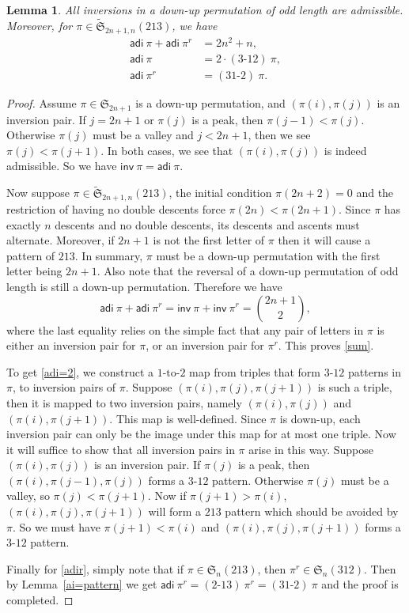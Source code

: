 \documentclass[12pt,reqno]{amsart}
\numberwithin{equation}{section}
\theoremstyle{plain}
\newtheorem{lemma}[theorem]{Lemma}
\theoremstyle{definition}
\def\S{\mathfrak{S}}
\def\ai{\mathsf{adi}}
\def\inv{\mathsf{inv}}
\def\cab{31\text{-}2}
\def\bac{2\text{-}13}
\begin{document}
\begin{lemma}\label{213ai}
All inversions in a down-up permutation of odd length are admissible. Moreover, for $\pi\in \widetilde{\S}_{2n+1, n}(213)$, we have
\begin{align}
\label{sum}
\ai\:\pi+\ai\:\pi^r &= 2n^2+n,\\
\label{adi=2}
\ai\:\pi &=2\cdot(3\text{-}12)\:\pi, \\
\label{adir}
\ai\:\pi^r &=(\cab)\:\pi.
\end{align}
\end{lemma}
\begin{proof}
Assume $\pi\in\S_{2n+1}$ is a down-up permutation, and $(\pi(i),\pi(j))$ is an inversion pair. If $j=2n+1$ or $\pi(j)$ is a peak, then $\pi(j-1)<\pi(j)$. Otherwise $\pi(j)$ must be a valley and $j<2n+1$, then we see $\pi(j)<\pi(j+1)$. In both cases, we see that $(\pi(i),\pi(j))$ is indeed admissible. So we have $\inv\:\pi=\ai\:\pi$.

Now suppose $\pi\in \widetilde{\S}_{2n+1, n}(213)$, the initial condition $\pi(2n+2)=0$ and the restriction of having no double descents force $\pi(2n)<\pi(2n+1)$. Since $\pi$ has exactly $n$ descents and no double descents, its descents and ascents must alternate. Moreover, if $2n+1$ is not the first letter of $\pi$ then it will cause a pattern of $213$. In summary, $\pi$ must be a down-up permutation with the first letter being $2n+1$. Also note that the reversal of a down-up permutation of odd length is still a down-up permutation. Therefore we have
$$\ai\:\pi+\ai\:\pi^r = \inv\:\pi+\inv\:\pi^r=\binom{2n+1}{2},$$
where the last equality relies on the simple fact that any pair of letters in $\pi$ is either an inversion pair for $\pi$, or an inversion pair for $\pi^r$. This proves \eqref{sum}.

To get \eqref{adi=2}, we construct a $1\text{-to-}2$ map from triples that form $3\text{-}12$ patterns in $\pi$, to inversion pairs of $\pi$. Suppose $(\pi(i),\pi(j),\pi(j+1))$ is such a triple, then it is mapped to two inversion pairs, namely $(\pi(i),\pi(j))$ and $(\pi(i),\pi(j+1))$. This map is well-defined. Since $\pi$ is down-up, each inversion pair can only be the image under this map for at most one triple. Now it will suffice to show that all inversion pairs in $\pi$ arise in this way. Suppose $(\pi(i),\pi(j))$ is an inversion pair. If $\pi(j)$ is a peak, then $(\pi(i),\pi(j-1),\pi(j))$ forms a $3\text{-}12$ pattern. Otherwise $\pi(j)$ must be a valley, so $\pi(j)<\pi(j+1)$. Now if $\pi(j+1)>\pi(i)$, $(\pi(i),\pi(j),\pi(j+1))$ will form a $213$ pattern which should be avoided by $\pi$. So we must have $\pi(j+1)<\pi(i)$ and $(\pi(i),\pi(j),\pi(j+1))$ forms a $3\text{-}12$ pattern.

Finally for \eqref{adir}, simply note that if $\pi\in\S_n(213)$, then $\pi^r\in\S_n(312)$. Then by Lemma~\ref{ai=pattern} we get $\ai\:\pi^r=(\bac)\:\pi^r=(\cab)\:\pi$ and the proof is completed.
\end{proof}
\end{document}
